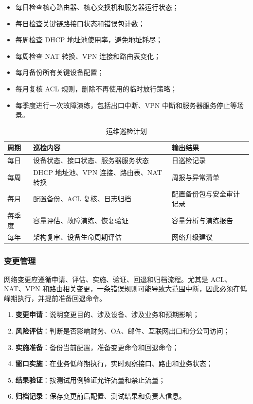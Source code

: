 \documentclass[12pt,a4paper]{ctexart}
\begin{document}
\begin{itemize}
    \item 每日检查核心路由器、核心交换机和服务器运行状态；
    \item 每日检查关键链路接口状态和错误包计数；
    \item 每周检查 DHCP 地址池使用率，避免地址耗尽；
    \item 每周检查 NAT 转换、VPN 连接和路由表变化；
    \item 每月备份所有关键设备配置；
    \item 每月复核 ACL 规则，删除不再使用的临时放行策略；
    \item 每季度进行一次故障演练，包括出口中断、VPN 中断和服务器服务停止等场景。
\end{itemize}

\begin{table}[H]
\centering
\caption{运维巡检计划}
\label{tab:ops-plan}
\begin{tabular}{|p{3cm}|p{5cm}|p{5cm}|}
\hline
\textbf{周期} & \textbf{巡检内容} & \textbf{输出结果} \\ \hline
每日 & 设备状态、接口状态、服务器服务状态 & 日巡检记录 \\ \hline
每周 & DHCP 地址池、VPN 连接、路由表、NAT 转换 & 周报与异常清单 \\ \hline
每月 & 配置备份、ACL 复核、日志归档 & 配置备份包与安全审计记录 \\ \hline
每季度 & 容量评估、故障演练、恢复验证 & 容量分析与演练报告 \\ \hline
每年 & 架构复审、设备生命周期评估 & 网络升级建议 \\ \hline
\end{tabular}
\end{table}

\subsubsection{变更管理}

网络变更应遵循申请、评估、实施、验证、回退和归档流程。尤其是 ACL、NAT、VPN 和路由相关变更，一条错误规则可能导致大范围中断，因此必须在低峰期执行，并提前准备回退命令。

\begin{enumerate}[label=(\arabic*), leftmargin=2em]
    \item \textbf{变更申请}：说明变更目的、涉及设备、涉及业务和预期影响；
    \item \textbf{风险评估}：判断是否影响财务、OA、邮件、互联网出口和分公司访问；
    \item \textbf{实施准备}：备份当前配置，准备变更命令和回退命令；
    \item \textbf{窗口实施}：在业务低峰期执行，实时观察接口、路由和业务状态；
    \item \textbf{结果验证}：按测试用例验证允许流量和禁止流量；
    \item \textbf{归档记录}：保存变更前后配置、测试结果和负责人信息。
\end{enumerate}
\end{document}
